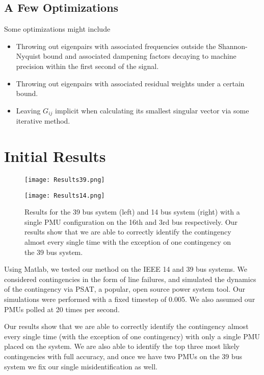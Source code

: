 \subsection{A Few Optimizations}
Some optimizations might include
\begin{itemize}
    \item Throwing out eigenpairs with associated frequencies outside the Shannon-Nyquist bound and associated dampening factors decaying to machine precision within the first second of the signal. 
    \item Throwing out eigenpairs with associated residual weights under a certain bound.
    \item Leaving $G_{ij}$ implicit when calculating its smallest singular vector via some iterative method. 
\end{itemize}

\section{Initial Results}
\begin{figure}[!ht] 
  \centering
  \begin{minipage}[b]{0.45\textwidth}
    \texttt{[image: Results39.png]}
  \end{minipage}
  \hfill
  \begin{minipage}[b]{0.45\textwidth}
    \texttt{[image: Results14.png]}
  \end{minipage}
\caption{Results for the 39 bus system (left) and 14 bus system (right) with a single PMU configuration on the 16th and 3rd bus respectively. Our results show that we are able to correctly identify the contingency almost every single time with the exception of one contingency on the 39 bus system. }
\end{figure}  \label{Results}
Using Matlab, we tested our method on the IEEE 14 and 39 bus systems. We considered contingencies in the form of line failures, and simulated the dynamics of the contingency via PSAT, a popular, open source power system tool. Our simulations were performed with a fixed timestep of 0.005. We also assumed our PMUs polled at 20 times per second. 

Our results show that we are able to correctly identify the contingency almost every single time (with the exception of one contingency) with only a single PMU placed on the system. We are also able to identify the top three most likely contingencies with full accuracy, and once we have two PMUs on the 39 bus system we fix our single misidentification as well.

